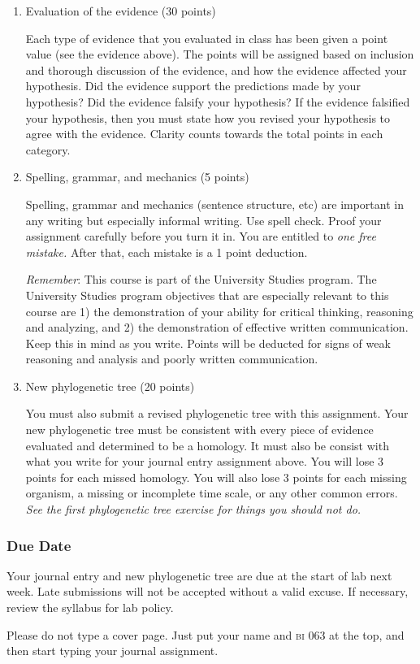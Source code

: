 \documentclass[12pt]{exam}
\begin{document}
\begin{enumerate}

\item Evaluation of the evidence (30 points)

Each type of evidence that you evaluated in class has been given a point
value (see the evidence above). The points will be assigned based on
inclusion and thorough discussion of the evidence, and how the evidence
affected your hypothesis. Did the evidence support the predictions made
by your hypothesis? Did the evidence falsify your hypothesis? If the
evidence falsified your hypothesis, then you must state how you revised
your hypothesis to agree with the evidence. Clarity counts towards the
total points in each category.

\item Spelling, grammar, and mechanics (5 points)

Spelling, grammar and
mechanics (sentence structure, etc) are important in any writing but especially informal writing. Use spell check. Proof your assignment carefully before you turn it in. You are entitled to \emph{one free
mistake.} After that, each mistake is a 1 point deduction.

\emph{Remember}: This course is part of the University Studies
program. The University Studies program objectives that are especially
relevant to this course are 1) the demonstration of your ability for
critical thinking, reasoning and analyzing, and 2) the demonstration of
effective written communication. Keep this in mind as you write. Points will be deducted for signs of
weak reasoning and analysis and poorly written communication.

\item New phylogenetic tree (20 points)

You must also submit a revised phylogenetic tree with this assignment. 
Your new phylogenetic tree must be consistent with every piece of
evidence evaluated and determined to be a homology. It must also be consist with what you write
for your journal entry assignment above. You will lose 3
points for each missed homology. You will also lose 3 points for each missing organism,
a missing or incomplete time scale, or any other common errors. \emph{See the first phylogenetic tree exercise for things you should not do.}

\end{enumerate}


\subsubsection*{Due Date} 

Your journal entry and new phylogenetic tree are due at the start of lab next week. Late submissions will not be accepted without a valid excuse. If necessary, review the syllabus for lab policy.

Please do not type a cover page. Just put your name and \textsc{bi} 063 at the
top, and then start typing your journal assignment.
\end{document}
